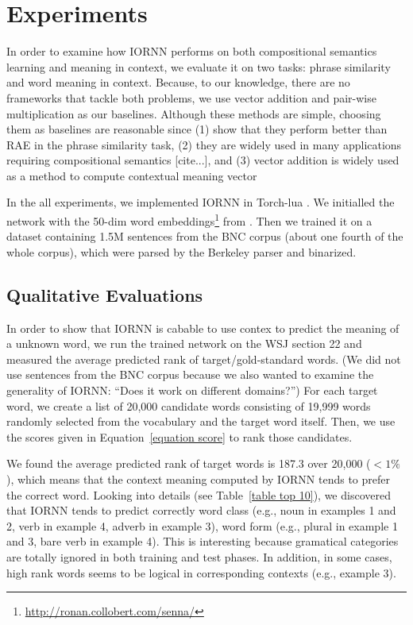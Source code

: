\documentclass[11pt]{article}
\begin{document}

\section{Experiments}
\label{section experiments}

In order to examine how IORNN performs on both compositional semantics learning and 
meaning in context, we evaluate it on two tasks: phrase similarity and 
word meaning in context. Because, to our knowledge, there are no frameworks 
that tackle both problems, we use vector addition and pair-wise multiplication 
as our baselines. Although these methods are simple, choosing them as baselines 
are reasonable since (1) \cite{blacoe_comparison_2012} show that they perform better than RAE in the 
phrase similarity task, (2) they are widely used in many applications requiring 
compositional semantics [cite...], and (3) vector addition is widely used as a method 
to compute contextual meaning vector \cite{thater2011word}

In the all experiments, we implemented IORNN in Torch-lua \cite{collobert_implementing_2012}.
We initialled the network with the 50-dim word embeddings\footnote{\url{http://ronan.collobert.com/senna/}} 
from \cite{collobert_natural_2011}. Then we trained it on a dataset containing 1.5M sentences
from the BNC corpus (about one fourth of the whole corpus), which were parsed by 
the Berkeley parser \cite{petrov2006learning} and binarized.

\subsection{Qualitative Evaluations}
\label{subsection qualitative eval}

In order to show that IORNN is cabable to use contex to predict the meaning of a unknown word, 
we run the trained network on the WSJ section 22 and measured the average predicted rank of 
target/gold-standard words. 
(We did not use sentences from the BNC corpus because we also wanted to examine the generality of IORNN: 
``Does it work on different domains?'')
For each target word, we create a list of 20,000 candidate words 
consisting of 19,999 words randomly selected from the vocabulary and the target word itself. Then, 
we use the scores given in Equation~\ref{equation score} to rank those candidates. 

We found the average predicted rank of target words is 187.3 over 20,000 ($< 1\%$), which means that 
the context meaning computed by IORNN tends to prefer the correct word. Looking into details 
(see Table~\ref{table top 10}), we discovered that IORNN tends to predict correctly word class (e.g., 
noun in examples 1 and 2, verb in example 4, adverb in example 3), word form (e.g., plural in example 1 and 3, 
bare verb in example 4). This is interesting because gramatical categories are totally ignored in both training 
and test phases. In addition, in some cases, high rank words seems to be logical in corresponding 
contexts (e.g., example 3).
\end{document}
